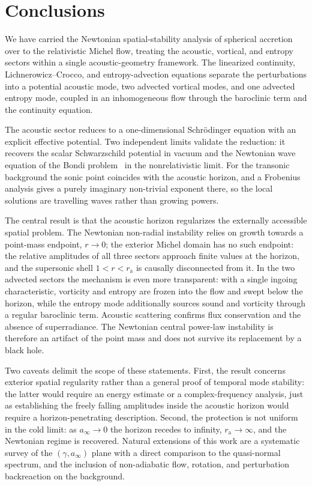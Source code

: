 \documentclass[12pt,a4paper,preprint,nopreprintline]{elsarticle}
\begin{document}
\section{Conclusions}
\label{sec:conclusions}

We have carried the Newtonian spatial-stability analysis of spherical accretion~\cite{KovalenkoIG_EreminMA_SpatialInstabilityOfSphericalAccretion_1998} over to the relativistic Michel flow, treating the acoustic, vortical, and entropy sectors within a single acoustic-geometry framework. The linearized continuity, Lichnerowicz--Crocco, and entropy-advection equations separate the perturbations into a potential acoustic mode, two advected vortical modes, and one advected entropy mode, coupled in an inhomogeneous flow through the baroclinic term and the continuity equation.

The acoustic sector reduces to a one-dimensional Schr\"odinger equation with an explicit effective potential. Two independent limits validate the reduction: it recovers the scalar Schwarzschild potential in vacuum and the Newtonian wave equation of the Bondi problem~\cite{KovalenkoIG_EreminMA_SpatialInstabilityOfSphericalAccretion_1998} in the nonrelativistic limit. For the transonic background the sonic point coincides with the acoustic horizon, and a Frobenius analysis gives a purely imaginary non-trivial exponent there, so the local solutions are travelling waves rather than growing powers.

The central result is that the acoustic horizon regularizes the externally accessible spatial problem. The Newtonian non-radial instability relies on growth towards a point-mass endpoint, $r\rightarrow0$; the exterior Michel domain has no such endpoint: the relative amplitudes of all three sectors approach finite values at the horizon, and the supersonic shell $1<r<r_{\mathrm{a}}$ is causally disconnected from it. In the two advected sectors the mechanism is even more transparent: with a single ingoing characteristic, vorticity and entropy are frozen into the flow and swept below the horizon, while the entropy mode additionally sources sound and vorticity through a regular baroclinic term. Acoustic scattering confirms flux conservation and the absence of superradiance. The Newtonian central power-law instability is therefore an artifact of the point mass and does not survive its replacement by a black hole.

Two caveats delimit the scope of these statements. First, the result concerns exterior spatial regularity rather than a general proof of temporal mode stability: the latter would require an energy estimate or a complex-frequency analysis, just as establishing the freely falling amplitudes inside the acoustic horizon would require a horizon-penetrating description. Second, the protection is not uniform in the cold limit: as $a_{\infty}\rightarrow0$ the horizon recedes to infinity, $r_{\mathrm{a}}\rightarrow\infty$, and the Newtonian regime is recovered. Natural extensions of this work are a systematic survey of the $(\gamma,a_{\infty})$ plane with a direct comparison to the quasi-normal spectrum, and the inclusion of non-adiabatic flow, rotation, and perturbation backreaction on the background.

\clearpage



\end{document}
